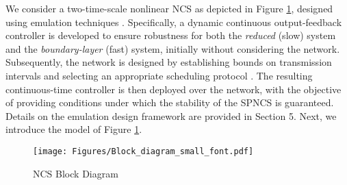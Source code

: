 We consider a two-time-scale nonlinear NCS as depicted in Figure \ref{fig: Block Diagram}, designed using emulation techniques \cite{dragan_stability}. Specifically, a dynamic continuous output-feedback controller is developed to ensure robustness for both the \emph{reduced} (slow) system and the \emph{boundary-layer} (fast) system, initially without considering the network. Subsequently, the network is designed by establishing bounds on transmission intervals and selecting an appropriate scheduling protocol \cite{dragan_stability}. The resulting continuous-time controller is then deployed over the network, with the objective of providing conditions under which the stability of the SPNCS is guaranteed. Details on the emulation design framework are provided in Section 5.
%
Next, we introduce the model of Figure \ref{fig: Block Diagram}.
%

\begin{figure}[H]
    \centering
    \texttt{[image: Figures/Block\_diagram\_small\_font.pdf]}
    \caption{NCS Block Diagram}
    \label{fig: Block Diagram}
\end{figure}

